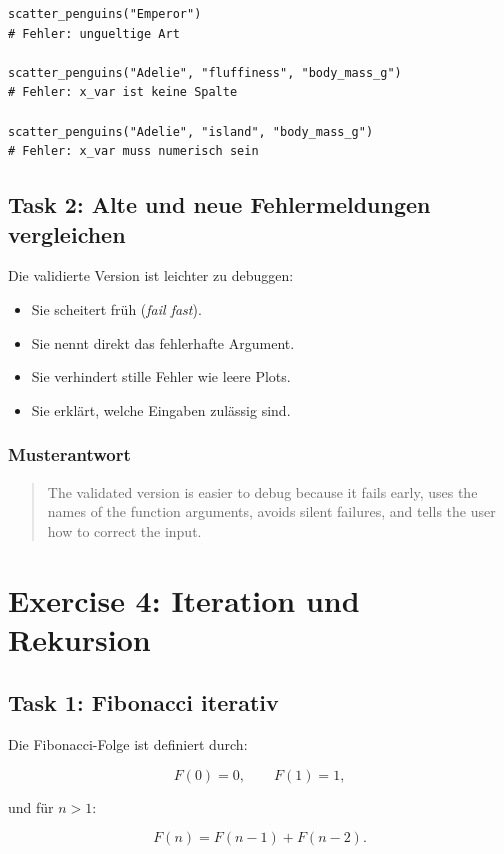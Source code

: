 \documentclass[11pt,a4paper]{ctexart}
\begin{document}
\begin{lstlisting}
scatter_penguins("Emperor")
# Fehler: ungueltige Art

scatter_penguins("Adelie", "fluffiness", "body_mass_g")
# Fehler: x_var ist keine Spalte

scatter_penguins("Adelie", "island", "body_mass_g")
# Fehler: x_var muss numerisch sein
\end{lstlisting}

\subsection{Task 2: Alte und neue Fehlermeldungen vergleichen}

Die validierte Version ist leichter zu debuggen:

\begin{itemize}
  \item Sie scheitert früh (\emph{fail fast}).
  \item Sie nennt direkt das fehlerhafte Argument.
  \item Sie verhindert stille Fehler wie leere Plots.
  \item Sie erklärt, welche Eingaben zulässig sind.
\end{itemize}

\subsubsection*{Musterantwort}

\begin{quote}
The validated version is easier to debug because it fails early, uses the
names of the function arguments, avoids silent failures, and tells the user
how to correct the input.
\end{quote}

\section{Exercise 4: Iteration und Rekursion}

\subsection{Task 1: Fibonacci iterativ}

Die Fibonacci-Folge ist definiert durch:

\[
F(0)=0,\qquad F(1)=1,
\]

und für \(n>1\):

\[
F(n)=F(n-1)+F(n-2).
\]
\end{document}
